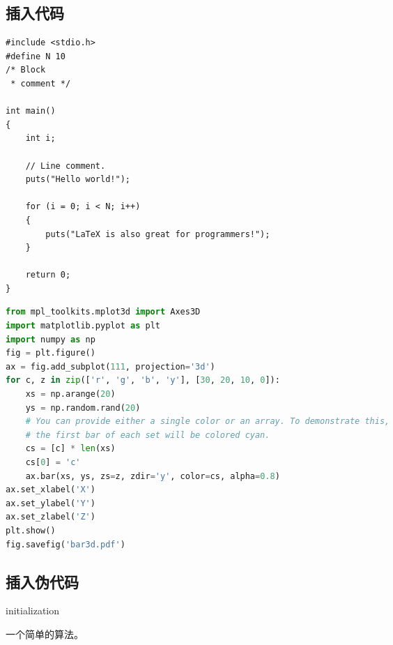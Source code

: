 \documentclass[UTF8]{ctexart}
\numberwithin{equation}{section} %
\numberwithin{table}{section} %
\begin{document}
\subsection{插入代码}
\lstset{escapechar=@,style=customc}

\begin{lstlisting}[caption={一段C语言程序。},captionpos=b]
#include <stdio.h>
#define N 10
/* Block
 * comment */

int main()
{
    int i;

    // Line comment.
    puts("Hello world!");
    
    for (i = 0; i < N; i++)
    {
        puts("LaTeX is also great for programmers!");
    }

    return 0;
}
\end{lstlisting}

\begin{lstlisting}[caption={一段Python语言程序。},captionpos=b,language=Python]
from mpl_toolkits.mplot3d import Axes3D
import matplotlib.pyplot as plt
import numpy as np
fig = plt.figure()
ax = fig.add_subplot(111, projection='3d')
for c, z in zip(['r', 'g', 'b', 'y'], [30, 20, 10, 0]):
    xs = np.arange(20)
    ys = np.random.rand(20)
    # You can provide either a single color or an array. To demonstrate this,
    # the first bar of each set will be colored cyan.
    cs = [c] * len(xs)
    cs[0] = 'c'
    ax.bar(xs, ys, zs=z, zdir='y', color=cs, alpha=0.8)
ax.set_xlabel('X')
ax.set_ylabel('Y')
ax.set_zlabel('Z')
plt.show()
fig.savefig('bar3d.pdf')
\end{lstlisting}

\subsection{插入伪代码}
\begin{algorithm}[H]
\SetAlgoLined
{}
 initialization\;
 \caption{一个简单的算法。}
\end{algorithm}
\end{document}
